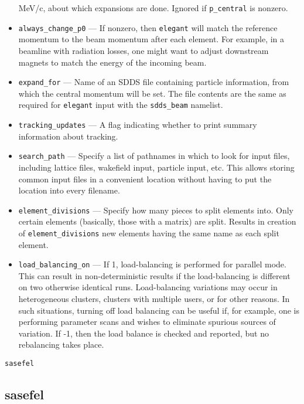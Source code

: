 \documentclass[11pt]{article}
\begin{document}
\begin{itemize}
MeV/c, about which expansions are done.  Ignored if \verb|p_central| is nonzero.
\item \verb|always_change_p0| --- If nonzero, then {\tt elegant} will match the reference momentum to
  the beam momentum after each element.  For example, in a beamline with radiation losses, one might
  want to adjust downstream magnets to match the energy of the incoming beam.
\item \verb|expand_for| --- Name of an SDDS file containing particle information, from which the central
momentum will be set.  The file contents are the same as required for {\tt elegant} input with the \verb|sdds_beam| namelist.
\item \verb|tracking_updates| --- A flag indicating whether to print summary information about
tracking.
\item \verb|search_path| --- Specify a list of pathnames in which to look for input files,
 including lattice files, wakefield input, particle input, etc.  This allows storing common
 input files in a convenient location without having to put the location into every filename.
\item \verb|element_divisions| --- Specify how many pieces to split elements into.  Only 
 certain elements (basically, those with a matrix) are split.  Results in creation of 
 \verb|element_divisions| new elements having the same name as each split element.
\item \verb|load_balancing_on| --- If 1, load-balancing is performed for parallel mode.
 This can result in non-deterministic results if the load-balancing is different on two
 otherwise identical runs.  Load-balancing variations may occur in heterogeneous clusters,
 clusters with multiple users, or for other reasons.  In such situations, turning off 
 load balancing can be useful if, for example, one is performing parameter scans and
 wishes to eliminate spurious sources of variation.
 If -1, then the load balance is checked and reported, but no rebalancing takes place.
\end{itemize}

\newpage
\begin{center}{\Large\verb|sasefel|}\end{center}
\subsection{sasefel \label{subsec:sasefel}}
\end{document}
